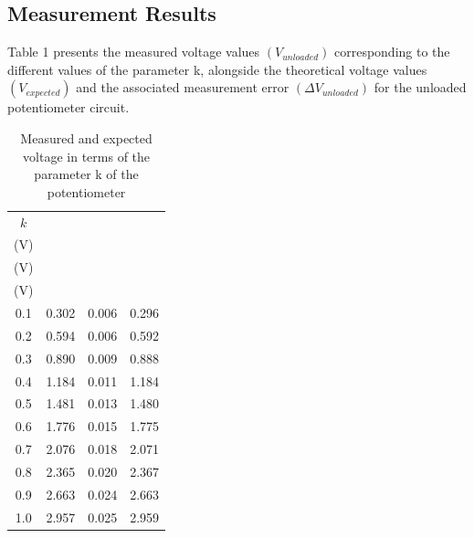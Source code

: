 \documentclass[a4paper]{article}
\begin{document}
\subsection{Measurement Results}
Table 1 presents the measured voltage values $(V_{unloaded})$ corresponding to the different values of 
the parameter k, alongside the theoretical voltage values $(V_{expected})$ and 
the associated measurement error $(\Delta V_{unloaded})$ for the unloaded potentiometer circuit.
\begin{table}[!ht]
    \centering
    \label{tab:1}
    \caption{Measured and expected voltage in terms of the parameter k of the potentiometer}
    \begin{tabular}{|c c c c|} 
    \hline
    $k$ & \makecell{$V_{unloaded}$ \\ (V)} & \makecell{$\Delta V_{unloaded}$ \\ (V)} &
    \makecell{$V_{expected}$ \\ (V)}  \\ 
    \hline
    0.1                                       & 0.302      &  0.006          & 0.296      \\
    0.2                                       & 0.594      &  0.006          & 0.592      \\
    0.3                                       & 0.890      &  0.009          & 0.888      \\
    0.4                                       & 1.184      &  0.011          & 1.184      \\
    0.5                                       & 1.481      &  0.013          & 1.480      \\
    0.6                                       & 1.776      &  0.015          & 1.775      \\
    0.7                                       & 2.076      &  0.018          & 2.071      \\
    0.8                                       & 2.365      &  0.020          & 2.367      \\
    0.9                                       & 2.663      &  0.024          & 2.663      \\
    1.0                                       & 2.957      &  0.025          & 2.959      \\
    \hline
    \end{tabular}
    \end{table}
\newpage
\end{document}
